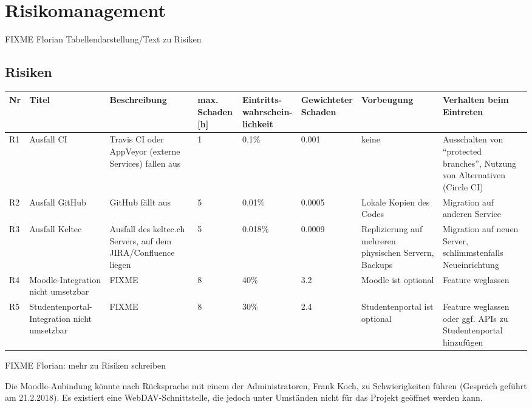 \documentclass[a4paper]{article}
\let\oldsection\section
\renewcommand\section{\clearpage\oldsection}
\begin{document}
\section{Risikomanagement}
FIXME Florian Tabellendarstellung/Text zu Risiken
\begin{landscape}
  \subsection{Risiken}
  
  \thispagestyle{empty}
  
  \begin{tabulary}{\linewidth}{lLLlLLLL}
    \toprule
    Nr & Titel & Beschreibung & \parbox[t]{5em}{max. \\ Schaden [h]} & \parbox[t]{8em}{Eintritts-\\wahrschein-\\lichkeit} & \parbox[t]{9em}{Gewichteter \\ Schaden} & Vorbeugung & Verhalten beim Eintreten \\
    \midrule
    R1 & Ausfall CI & Travis CI oder AppVeyor (externe Services) fallen aus & 1 & 0.1\% & 0.001 & keine & Ausschalten von ``protected branches'', Nutzung von Alternativen (Circle CI) \\ \hline
    R2 & Ausfall GitHub & GitHub fällt aus & 5 & 0.01\% & 0.0005 & Lokale Kopien des Codes & Migration auf anderen Service \\ \hline
    R3 & Ausfall Keltec & Ausfall des keltec.ch Servers, auf dem JIRA/Confluence liegen & 5 & 0.018\% & 0.0009 & Replizierung auf mehreren physischen Servern, Backups & Migration auf neuen Server, schlimmstenfalls Neueinrichtung \\ \hline
    R4 & Moodle-Integration nicht umsetzbar & FIXME & 8 & 40\% & 3.2 & Moodle ist optional & Feature weglassen \\ \hline
    R5 & Studentenportal-Integration nicht umsetzbar & FIXME & 8 & 30\% & 2.4 & Studentenportal ist optional & Feature weglassen oder ggf. APIs zu Studentenportal hinzufügen \\ 
    \bottomrule
  \end{tabulary}
\end{landscape}
\restoregeometry

FIXME Florian: mehr zu Risiken schreiben

Die Moodle-Anbindung könnte nach Rücksprache mit einem der Administratoren, Frank Koch, zu Schwierigkeiten führen (Gespräch geführt am 21.2.2018). Es existiert eine WebDAV-Schnittstelle, die jedoch unter Umständen nicht für das Projekt geöffnet werden kann.
\end{document}
